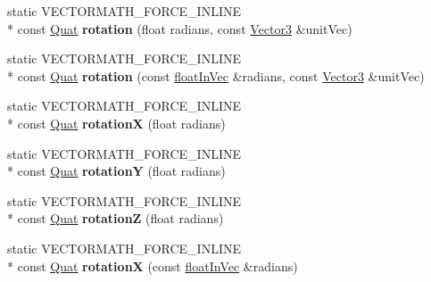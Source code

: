 \begin{DoxyCompactItemize}
\item 
\hypertarget{class_vectormath_1_1_aos_1_1_quat_abf5142c735bddf65c1b73e3d425dd7bc}{static V\+E\+C\+T\+O\+R\+M\+A\+T\+H\+\_\+\+F\+O\+R\+C\+E\+\_\+\+I\+N\+L\+I\+N\+E \\*
const \hyperlink{class_vectormath_1_1_aos_1_1_quat}{Quat} {\bfseries rotation} (float radians, const \hyperlink{class_vectormath_1_1_aos_1_1_vector3}{Vector3} \&unit\+Vec)}\label{class_vectormath_1_1_aos_1_1_quat_abf5142c735bddf65c1b73e3d425dd7bc}

\item 
\hypertarget{class_vectormath_1_1_aos_1_1_quat_a83eb4f0fe22fbd7a3ec691189974dfce}{static V\+E\+C\+T\+O\+R\+M\+A\+T\+H\+\_\+\+F\+O\+R\+C\+E\+\_\+\+I\+N\+L\+I\+N\+E \\*
const \hyperlink{class_vectormath_1_1_aos_1_1_quat}{Quat} {\bfseries rotation} (const \hyperlink{class_vectormath_1_1float_in_vec}{float\+In\+Vec} \&radians, const \hyperlink{class_vectormath_1_1_aos_1_1_vector3}{Vector3} \&unit\+Vec)}\label{class_vectormath_1_1_aos_1_1_quat_a83eb4f0fe22fbd7a3ec691189974dfce}

\item 
\hypertarget{class_vectormath_1_1_aos_1_1_quat_adb1cf746cbe7fa5cf69664b436be84c2}{static V\+E\+C\+T\+O\+R\+M\+A\+T\+H\+\_\+\+F\+O\+R\+C\+E\+\_\+\+I\+N\+L\+I\+N\+E \\*
const \hyperlink{class_vectormath_1_1_aos_1_1_quat}{Quat} {\bfseries rotation\+X} (float radians)}\label{class_vectormath_1_1_aos_1_1_quat_adb1cf746cbe7fa5cf69664b436be84c2}

\item 
\hypertarget{class_vectormath_1_1_aos_1_1_quat_ab0b7ce8590c59acd31ed131321d08704}{static V\+E\+C\+T\+O\+R\+M\+A\+T\+H\+\_\+\+F\+O\+R\+C\+E\+\_\+\+I\+N\+L\+I\+N\+E \\*
const \hyperlink{class_vectormath_1_1_aos_1_1_quat}{Quat} {\bfseries rotation\+Y} (float radians)}\label{class_vectormath_1_1_aos_1_1_quat_ab0b7ce8590c59acd31ed131321d08704}

\item 
\hypertarget{class_vectormath_1_1_aos_1_1_quat_ac8eb2952c4d6297593c617cfd1edf16d}{static V\+E\+C\+T\+O\+R\+M\+A\+T\+H\+\_\+\+F\+O\+R\+C\+E\+\_\+\+I\+N\+L\+I\+N\+E \\*
const \hyperlink{class_vectormath_1_1_aos_1_1_quat}{Quat} {\bfseries rotation\+Z} (float radians)}\label{class_vectormath_1_1_aos_1_1_quat_ac8eb2952c4d6297593c617cfd1edf16d}

\item 
\hypertarget{class_vectormath_1_1_aos_1_1_quat_a4b7eb17a62487bdda816a311e76d5112}{static V\+E\+C\+T\+O\+R\+M\+A\+T\+H\+\_\+\+F\+O\+R\+C\+E\+\_\+\+I\+N\+L\+I\+N\+E \\*
const \hyperlink{class_vectormath_1_1_aos_1_1_quat}{Quat} {\bfseries rotation\+X} (const \hyperlink{class_vectormath_1_1float_in_vec}{float\+In\+Vec} \&radians)}\label{class_vectormath_1_1_aos_1_1_quat_a4b7eb17a62487bdda816a311e76d5112}


\end{DoxyCompactItemize}
